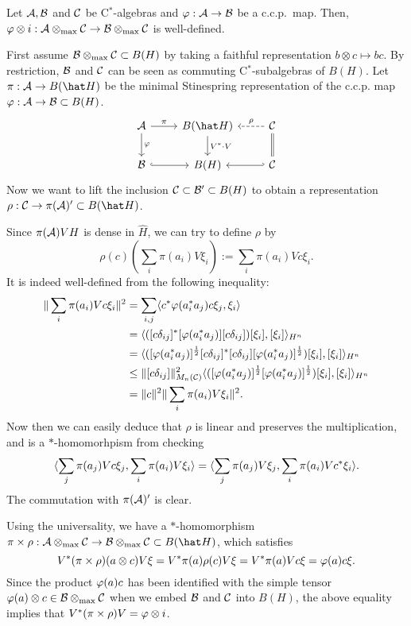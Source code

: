 \documentclass{../../small}
\begin{document}
\begin{prop}
Let $\mathcal{A},\mathcal{B}$ and $\mathcal{C}$ be C$^*$-algebras and $\varphi:\mathcal{A}\to\mathcal{B}$ be a c.c.p.~map.
Then, $\varphi\otimes i:\mathcal{A}\otimes_{\max}\mathcal{C}\to\mathcal{B}\otimes_{\max}\mathcal{C}$ is well-defined.
\end{prop}
\begin{pf}
First assume $\mathcal{B}\otimes_{\max}\mathcal{C}\subset B(H)$ by taking a faithful representation $b\otimes c\mapsto bc$.
By restriction, $\mathcal{B}$ and $\mathcal{C}$ can be seen as commuting C$^*$-subalgebras of $B(H)$.
Let $\pi:\cA\to B(\hat H)$ be the minimal Stinespring representation of the c.c.p. map $\varphi:\mathcal{A}\to\mathcal{B}\subset B(H)$.
\[\begin{tikzcd}
\cA\ar{d}{\f}\ar{r}{\pi}&B(\hat H)\ar{d}{V^*\cdot V}&\cC\ar[equal]{d}\ar[dashed,swap]{l}{\rho}\\
\cB\ar[hook]{r}&B(H)&\cC\ar[hook']{l}
\end{tikzcd}\]
Now we want to lift the inclusion $\mathcal{C}\subset\mathcal{B}'\subset B(H)$ to obtain a representation $\rho:\cC\to\pi(\cA)'\subset B(\hat H)$.

Since $\pi(\mathcal{A})VH$ is dense in $\hat H$, we can try to define $\rho$ by
\[\rho(c)(\sum_i\pi(a_i)V\xi_i):=\sum_i\pi(a_i)Vc\xi_i.\]
It is indeed well-defined from the following inequality:
\begin{align*}
\|\sum_i\pi(a_i)Vc\xi_i\|^2
&=\sum_{i,j}\langle c^*\varphi(a_i^*a_j)c\xi_j,\xi_i\rangle\\
&=\langle([c\delta_{ij}]^*[\varphi(a_i^*a_j)][c\delta_{ij}])[\xi_i],[\xi_i]\rangle_{H^n}\\
&=\langle([\varphi(a_i^*a_j)]^{\frac12}[c\delta_{ij}]^*[c\delta_{ij}][\varphi(a_i^*a_j)]^{\frac12})[\xi_i],[\xi_i]\rangle_{H^n}\\
&\le\|[c\delta_{ij}]\|_{M_n(\mathcal{C})}^2\langle([\varphi(a_i^*a_j)]^{\frac12}[\varphi(a_i^*a_j)]^{\frac12})[\xi_i],[\xi_i]\rangle_{H^n}\\
&=\|c\|^2\|\sum_i\pi(a_i)V\xi_i\|^2.
\end{align*}
Now then we can easily deduce that $\rho$ is linear and preserves the multiplication, and is a $*$-homomorhpism from checking
\[\langle\sum_j\pi(a_j)Vc\xi_j,\sum_i\pi(a_i)V\xi_i\rangle=\langle\sum_j\pi(a_j)V\xi_j,\sum_i\pi(a_i)Vc^*\xi_i\rangle.\]
The commutation with $\pi(\mathcal{A})'$ is clear.

Using the universality, we have a $*$-homomorphism $\pi\times\rho:\cA\otimes_{\max}\cC\to\cB\otimes_{\max}\cC\subset B(\hat H)$, which satisfies
\[V^*(\pi\times\rho)(a\otimes c)V\xi=V^*\pi(a)\rho(c)V\xi=V^*\pi(a)Vc\xi=\varphi(a)c\xi.\]
Since the product $\varphi(a)c$ has been identified with the simple tensor $\varphi(a)\otimes c\in\mathcal{B}\otimes_{\max}\mathcal{C}$ when we embed $\mathcal{B}$ and $\mathcal{C}$ into $B(H)$, the above equality implies that $V^*(\pi\times\rho)V=\varphi\otimes i$.
\end{pf}
\end{document}
